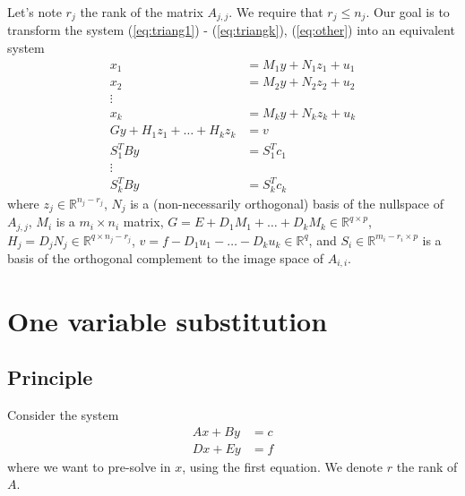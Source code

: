 \documentclass[]{article}
\theoremstyle{definition}
\begin{document}
Let's note $r_j$ the rank of the matrix $A_{j,j}$. We require that $r_j \leq n_j$.
Our goal is to transform the system (\ref{eq:triang1}) - (\ref{eq:triangk}), (\ref{eq:other}) into an equivalent system
\begin{align}
  x_1 &= M_1 y + N_1 z_1 + u_1 \\
	x_2 &= M_2 y + N_2 z_2 + u_2 \\
  \vdots & \nonumber \\
	x_k &= M_k y + N_k z_k + u_k \\
	G y + H_1 z_1 + \ldots + H_k z_k &= v \\
	S_1^T B y &= S_1^T c_1 \\
	\vdots \nonumber \\
	S_k^T B y &= S_k^T c_k
\end{align}
where $z_j \in \mathbb{R}^{n_j-r_j}$, $N_j$ is a (non-necessarily orthogonal) basis of the nullspace of $A_{j,j}$, $M_i$ is a $m_i \times n_i$ matrix, $G = E + D_1 M_1 + \ldots + D_k M_k \in \mathbb{R}^{q\times p}$, $H_j = D_j N_j \in \mathbb{R}^{q\times n_j-r_j}$, $v = f - D_1 u_1 - \ldots - D_k u_k \in \mathbb{R}^q$, and $S_i \in \mathbb{R}^{m_i-r_i \times p}$ is a basis of the orthogonal complement to the image space of $A_{i,i}$.


\section{One variable substitution}
\subsection{Principle}
Consider the system
\begin{align}
	A x + B y &= c \label{eq:simple1}\\
	D x + E y &= f \label{eq:simple2}
\end{align}
where we want to pre-solve in $x$, using the first equation. We denote $r$ the rank of $A$.
\end{document}
